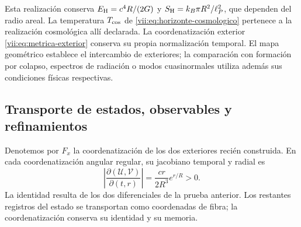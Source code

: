 Esta realización conserva
\(E_{\rm H}=c^4R/(2G)\) y
\(S_{\rm H}=k_B\pi R^2/\ell_P^2\), que dependen del radio areal.
La temperatura \(T_{\rm cos}\) de
\eqref{vii:eq:horizonte-cosmologico} pertenece a la realización
cosmológica allí declarada. La coordenatización exterior
\eqref{vii:eq:metrica-exterior} conserva su propia normalización temporal.
El mapa geométrico establece el intercambio de exteriores; la comparación
con formación por colapso, espectros de radiación o modos cuasinormales
utiliza además sus condiciones físicas respectivas.

\subsection{Transporte de estados, observables y refinamientos}
\label{vii:subsec:transporte-informacion-horizonte}

Denotemos por \(F_x\) la coordenatización de los dos exteriores recién construida.
En cada coordenatización angular regular, su jacobiano temporal y radial es
\begin{equation}
 \left|\frac{\partial(\mathcal U,\mathcal V)}{\partial(t,r)}\right|
 =\frac{cr}{2R^3}e^{r/R}>0.
 \label{vii:eq:jacobiano-kruskal}
\end{equation}
La identidad resulta de los dos diferenciales de la prueba anterior.
Los restantes registros del estado se transportan como coordenadas de
fibra; la coordenatización conserva su identidad y su memoria.

